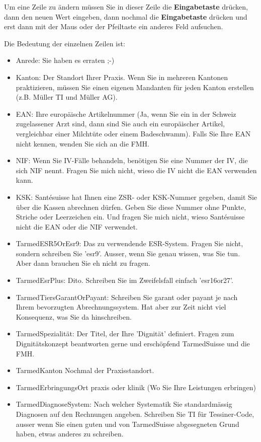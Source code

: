 \documentclass[a4paper]{scrartcl}
\begin{document}
Um eine Zeile zu ändern müssen Sie in dieser Zeile die \textbf{Eingabetaste} drücken, dann den neuen Wert eingeben, dann nochmal die \textbf{Eingabetaste} drücken und erst dann mit der Maus oder der Pfeiltaste ein anderes Feld aufsuchen.

Die Bedeutung der einzelnen Zeilen ist:
\begin{itemize}
\item Anrede: Sie haben es erraten ;-)
\item Kanton: Der Standort Ihrer Praxis. Wenn Sie in mehreren Kantonen praktizieren, müssen Sie einen eigenen Mandanten für jeden Kanton erstellen (z.B. Müller TI und Müller AG).
\item EAN: Ihre europäische Artikelnummer (Ja, wenn Sie ein in der Schweiz zugelassener Arzt sind, dann sind Sie auch ein europäischer Artikel, vergleichbar einer Milchtüte oder einem Badeschwamm). Falls Sie Ihre EAN nicht kennen, wenden Sie sich an die FMH.
\item NIF: Wenn Sie IV-Fälle behandeln, benötigen Sie eine Nummer der IV, die sich NIF nennt. Fragen Sie mich nicht, wieso die IV nicht die EAN verwenden kann.
\item KSK: Santésuisse hat Ihnen eine ZSR- oder KSK-Nummer gegeben, damit Sie über die Kassen abrechnen dürfen. Geben Sie diese Nummer ohne Punkte, Striche oder Leerzeichen ein. Und fragen Sie mich nicht, wieso Santésuisse nicht die EAN oder die NIF verwendet.
\item TarmedESR5OrEsr9: Das zu verwendende ESR-System. Fragen Sie  nicht, sondern schreiben Sie 'esr9'. Ausser, wenn Sie genau wissen, was Sie tun. Aber dann brauchen Sie eh nicht zu fragen.
\item TarmedEsrPlus: Dito. Schreiben Sie im Zweifelsfall einfach 'esr16or27'.
\item TarmedTiersGarantOrPayant: Schreiben Sie garant oder payant je nach Ihrem bevorzugten Abrechnungssystem. Hat aber zur Zeit nicht viel Konsequenz, was Sie da hinschreiben.
\item TarmedSpezialität: Der Titel, der Ihre 'Dignität' definiert. Fragen zum  Dignitätskonzept beantworten gerne und erschöpfend TarmedSuisse und die FMH.
\item TarmedKanton Nochmal der Praxisstandort.
\item TarmedErbringungsOrt praxis oder klinik (Wo Sie Ihre Leistungen erbringen)
\item TarmedDiagnoseSystem: Nach welcher Systematik Sie standardmässig Diagnosen auf den Rechnungen angeben. Schreiben Sie TI für Tessiner-Code, ausser wenn Sie einen guten und von TarmedSuisse abgesegneten Grund haben, etwas anderes zu schreiben.
\end{itemize}
\end{document}
